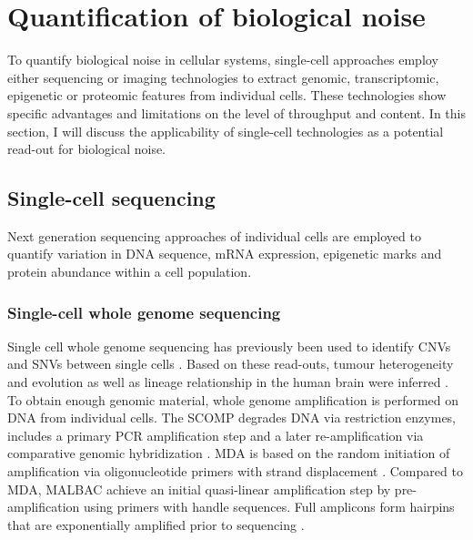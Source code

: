 
\section{Quantification of biological noise} 

To quantify biological noise in cellular systems, single-cell approaches employ either sequencing or imaging technologies to extract genomic, transcriptomic, epigenetic or proteomic features from individual cells. These technologies show specific advantages and limitations on the level of throughput and content. In this section, I will discuss the applicability of single-cell technologies as a potential read-out for biological noise.

\subsection{Single-cell sequencing}

Next generation sequencing approaches of individual cells are employed to quantify variation in DNA sequence, mRNA expression, epigenetic marks and protein abundance within a cell population. 

\subsubsection{Single-cell whole genome sequencing}

Single cell whole genome sequencing has previously been used to identify CNVs and SNVs between single cells \citep{Shpunt2012}. Based on these read-outs, tumour heterogeneity and evolution \citep{Navin2011} as well as lineage relationship in the human brain were inferred \citep{Evrony2015}. To obtain enough genomic material, whole genome amplification is performed on DNA from individual cells. The \gls{SCOMP} degrades DNA via restriction enzymes, includes a primary PCR amplification step and a later re-amplification via comparative genomic hybridization \citep{Klein1999}. \Gls{MDA} is based on the random initiation of amplification via oligonucleotide primers with strand displacement \citep{Dean2002}. Compared to MDA, \gls{MALBAC} achieve an initial quasi-linear amplification step by pre-amplification using primers with handle sequences. Full amplicons form hairpins that are exponentially amplified prior to sequencing \citep{Shpunt2012}. 

